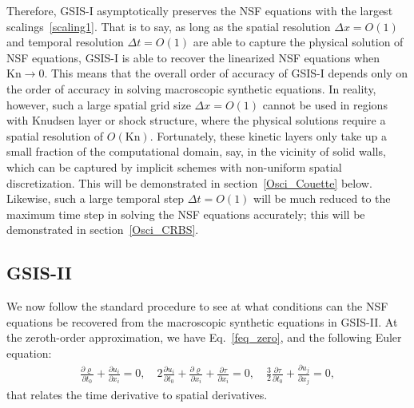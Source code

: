\documentclass[onefignum,onetabnum]{siamart171218}
\begin{document}
%


Therefore, GSIS-I asymptotically preserves the NSF equations with the largest scalings~\eqref{scaling1}. That is to say, as long as the spatial resolution $\Delta{x}=O(1)$ and temporal resolution $\Delta{t}=O(1)$ are able to capture the physical solution of NSF equations, GSIS-I is able to recover the linearized NSF equations when $\text{Kn}\rightarrow0$. This means that the overall order of accuracy of GSIS-I depends only on the order of accuracy in solving macroscopic synthetic equations.
In reality, however, such a large spatial grid size $\Delta{x}=O(1)$ cannot be used in regions with Knudsen layer or shock structure, where the physical solutions require a spatial resolution of $O(\text{Kn})$. Fortunately, these kinetic layers only take up a small fraction of the computational domain, say, in the vicinity of solid walls, which can be captured by implicit schemes with non-uniform spatial discretization. This will be demonstrated in section~\ref{Osci_Couette} below. Likewise, such a large temporal step $\Delta{t}=O(1)$ will be much reduced to the maximum time step in solving the NSF equations accurately; this will be demonstrated in section~\ref{Osci_CRBS}.





\subsection{GSIS-II}



We now follow the standard procedure to see at what conditions can the NSF equations be recovered from the macroscopic synthetic equations in GSIS-II. At the zeroth-order approximation, we have Eq.~\eqref{feq_zero}, and the following Euler equation:
	\begin{equation}\label{eq123_0}
	\begin{aligned}
	\frac{\partial {\varrho}}{\partial{t_0}}+\frac{\partial {u_i}}{\partial{x_i}}=0, \quad
	2\frac{\partial {u_i}}{\partial{t_0}}+\frac{\partial {\varrho}}{\partial{x_i}}+\frac{\partial {\tau}}{\partial{x_i}}=0, \quad
	\frac{3}{2}\frac{\partial {\tau}}{\partial{t_0}}+\frac{\partial {u_j}}{\partial{x_j}}=0,
	\end{aligned}
	\end{equation}
	that relates the time derivative to spatial derivatives. 
\end{document}
